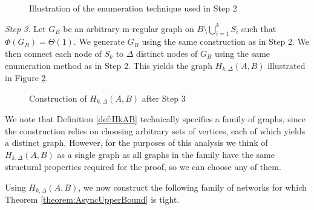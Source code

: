 \begin{definition}
    \begin{figure}[h]
        \centering
        
        \caption{Illustration of the enumeration technique used in Step 2}
        \label{fig:HkAB_2}
    \end{figure}


	\textit{Step 3.} Let $G_B$ be an arbitrary m-regular graph on $B \setminus \bigcup_{i=1}^k S_i$ such that $\Phi(G_B) = \Theta(1)$. 
	We generate $G_B$ using the same construction as in Step 2. We then connect each node of $S_k$ to $\Delta$ distinct nodes of $G_B$ using the same enumeration method as in Step 2. This yields the graph $H_{k, \Delta}(A,B)$ illustrated in Figure \ref{fig:HkAB_3}.

    \begin{figure}[h]
        \centering
        
        \caption{Construction of $H_{k, \Delta}(A,B)$ after Step 3}
        \label{fig:HkAB_3}
    \end{figure}


\end{definition}

We note that Definition \ref{def:HkAB} technically specifies a family of graphs, since the construction relies on choosing arbitrary sets of vertices, each of which yields a distinct graph. However, for the purposes of this analysis we think of $H_{k, \Delta}(A,B)$ as a single graph as all graphs in the family have the same structural properties required for the proof, so we can choose any of them. %

Using $H_{k, \Delta}(A,B)$, we now construct the following family of networks for which Theorem \ref{theorem:AsyncUpperBound} is tight.

